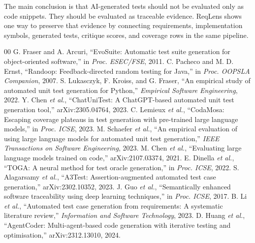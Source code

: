 \documentclass[conference]{IEEEtran}
\begin{document}
The main conclusion is that AI-generated tests should not be evaluated only as
code snippets. They should be evaluated as traceable evidence. ReqLens shows
one way to preserve that evidence by connecting requirements, implementation
symbols, generated tests, critique scores, and coverage rows in the same
pipeline.

\begin{thebibliography}{00}
 G. Fraser and A. Arcuri, ``EvoSuite: Automatic test suite generation for object-oriented software,'' in \textit{Proc. ESEC/FSE}, 2011.
 C. Pacheco and M. D. Ernst, ``Randoop: Feedback-directed random testing for Java,'' in \textit{Proc. OOPSLA Companion}, 2007.
 S. Lukasczyk, F. Kroiss, and G. Fraser, ``An empirical study of automated unit test generation for Python,'' \textit{Empirical Software Engineering}, 2022.
 Y. Chen \textit{et al.}, ``ChatUniTest: A ChatGPT-based automated unit test generation tool,'' arXiv:2305.04764, 2023.
 C. Lemieux \textit{et al.}, ``CodaMosa: Escaping coverage plateaus in test generation with pre-trained large language models,'' in \textit{Proc. ICSE}, 2023.
 M. Schaefer \textit{et al.}, ``An empirical evaluation of using large language models for automated unit test generation,'' \textit{IEEE Transactions on Software Engineering}, 2023.
 M. Chen \textit{et al.}, ``Evaluating large language models trained on code,'' arXiv:2107.03374, 2021.
 E. Dinella \textit{et al.}, ``TOGA: A neural method for test oracle generation,'' in \textit{Proc. ICSE}, 2022.
 S. Alagarsamy \textit{et al.}, ``A3Test: Assertion-augmented automated test case generation,'' arXiv:2302.10352, 2023.
 J. Guo \textit{et al.}, ``Semantically enhanced software traceability using deep learning techniques,'' in \textit{Proc. ICSE}, 2017.
 B. Li \textit{et al.}, ``Automated test case generation from requirements: A systematic literature review,'' \textit{Information and Software Technology}, 2023.
 D. Huang \textit{et al.}, ``AgentCoder: Multi-agent-based code generation with iterative testing and optimisation,'' arXiv:2312.13010, 2024.
\end{thebibliography}
\end{document}
